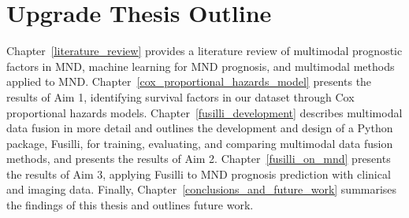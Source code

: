 \section{Upgrade Thesis Outline}

Chapter~\ref{literature_review} provides a literature review of multimodal prognostic factors in MND, machine learning for MND prognosis, and multimodal methods applied to MND.
Chapter~\ref{cox_proportional_hazards_model} presents the results of Aim 1, identifying survival factors in our dataset through Cox proportional hazards models.
Chapter~\ref{fusilli_development} describes multimodal data fusion in more detail and outlines the development and design of a Python package, Fusilli, for training, evaluating, and comparing multimodal data fusion methods, and presents the results of Aim 2.
Chapter~\ref{fusilli_on_mnd} presents the results of Aim 3, applying Fusilli to MND prognosis prediction with clinical and imaging data.
Finally, Chapter~\ref{conclusions_and_future_work} summarises the findings of this thesis and outlines future work.